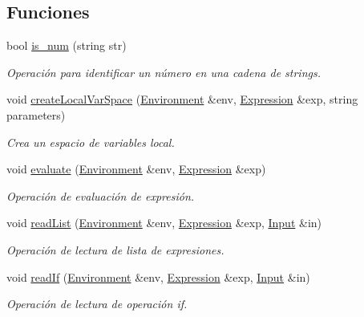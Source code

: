 \subsection*{Funciones}
\begin{DoxyCompactItemize}
\item 
bool \hyperlink{_functions_i_o_8hh_ae6062008fb1c70242c967349d6ee0f9b}{is\+\_\+num} (string str)
\begin{DoxyCompactList}\small\item\em Operación para identificar un número en una cadena de strings. \end{DoxyCompactList}\item 
void \hyperlink{_functions_i_o_8hh_a77ed86fa2fad279d440800e10d0f4a9a}{create\+Local\+Var\+Space} (\hyperlink{class_environment}{Environment} \&env, \hyperlink{class_expression}{Expression} \&exp, string parameters)
\begin{DoxyCompactList}\small\item\em Crea un espacio de variables local. \end{DoxyCompactList}\item 
void \hyperlink{_functions_i_o_8hh_ad4d84fbc6c7e89fb6c14869a204e0913}{evaluate} (\hyperlink{class_environment}{Environment} \&env, \hyperlink{class_expression}{Expression} \&exp)
\begin{DoxyCompactList}\small\item\em Operación de evaluación de expresión. \end{DoxyCompactList}\item 
void \hyperlink{_functions_i_o_8hh_aa35945b371ae9ece372fe0a7c8e97aee}{read\+List} (\hyperlink{class_environment}{Environment} \&env, \hyperlink{class_expression}{Expression} \&exp, \hyperlink{class_input}{Input} \&in)
\begin{DoxyCompactList}\small\item\em Operación de lectura de lista de expresiones. \end{DoxyCompactList}\item 
void \hyperlink{_functions_i_o_8hh_ae5d92549027ba3619eca48a15b567682}{read\+If} (\hyperlink{class_environment}{Environment} \&env, \hyperlink{class_expression}{Expression} \&exp, \hyperlink{class_input}{Input} \&in)
\begin{DoxyCompactList}\small\item\em Operación de lectura de operación \textquotesingle{}if\textquotesingle{}. \end{DoxyCompactList}\item 

\end{DoxyCompactItemize}
